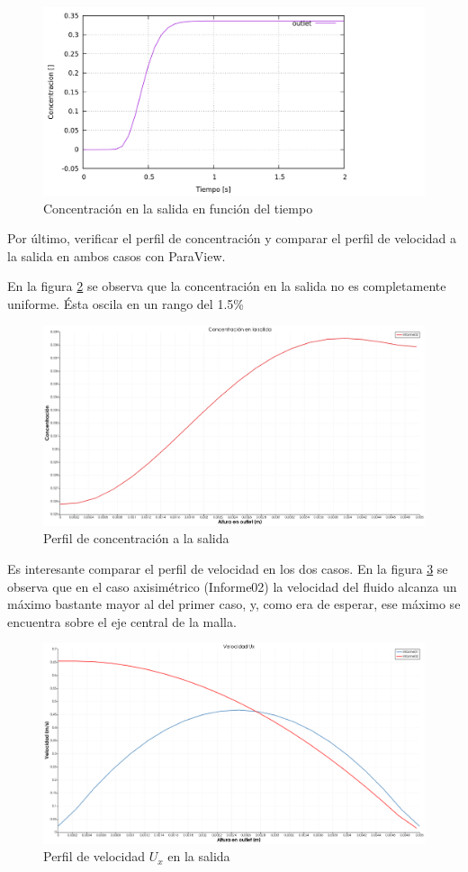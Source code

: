 \documentclass{article}
\begin{document}
\begin{figure}[h!]
	\centering
	\includegraphics[width=1\textwidth]{Figuras/07_patchAverage.png}
	\caption{Concentración en la salida en función del tiempo}
	\label{fig:curva_conc}
\end{figure}

Por último, verificar el perfil de concentración y comparar el perfil de velocidad a la salida en ambos casos con ParaView.

En la figura \ref{fig:curva_conc} se observa que la concentración en la salida no es completamente uniforme. Ésta oscila en un rango del 1.5\%

\begin{figure}[h!]
	\centering
	\includegraphics[width=1\textwidth]{Figuras/07_perfilT.png}
	\caption{Perfil de concentración a la salida}
	\label{fig:curva_conc}
\end{figure}

Es interesante comparar el perfil de velocidad en los dos casos. En la figura \ref{fig:curva_comp_ux} se observa que en el caso axisimétrico (Informe02) la velocidad del fluido alcanza un máximo bastante mayor al del primer caso, y, como era de esperar, ese máximo se encuentra sobre el eje central de la malla.

\begin{figure}[h!]
	\centering
	\includegraphics[width=1\textwidth]{Figuras/07_comparacion_Ux.png}
	\caption{Perfil de velocidad $U_x$ en la salida}
	\label{fig:curva_comp_ux}
\end{figure}
\end{document}
